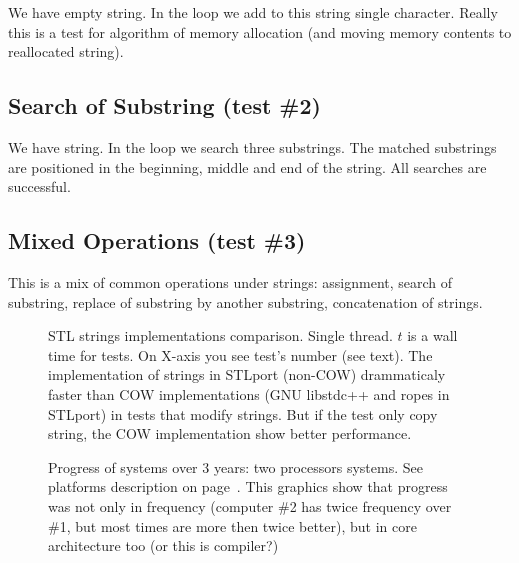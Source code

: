 \documentclass[a4paper]{article}
\providecommand{\STLport}{{\fontfamily{cmss}\selectfont STLport}}
\providecommand{\libstd}{{\fontfamily{cmtt}\selectfont GNU \mbox{libstdc++}}}
\begin{document}
We have empty string. In the loop we add to this string single
character.
Really this is a test for algorithm
of memory allocation (and moving memory contents to reallocated string).



\subsection{Search of Substring\label{search-string} (test \#2)}

We have string. In the loop we search three substrings.
The matched substrings are positioned in
the beginning, middle and end of the string. All searches are
successful.



\subsection{Mixed Operations\label{mixed-string} (test \#3)}

This is a mix of common operations under strings: assignment,
search of substring, replace of substring by another substring,
concatenation of strings.



\begin{figure}
  \begin{center}
    
  \end{center}
  \caption{STL strings implementations comparison. Single thread. $t$ is a wall time
           for tests. On X-axis you see test's number (see text).
           The implementation of strings in \STLport{} (non-COW)
           drammaticaly faster than COW implementations (\libstd{} and
           ropes in \STLport{}) in tests that modify strings.
           But if the test only copy string, the COW implementation show better
           performance.
           \label{STLport-gpp-strings}}
\end{figure}

\begin{figure}
  \begin{center}
    
  \end{center}
  \caption{Progress of systems over 3 years: two processors systems. See platforms description
           on page~\pageref{AMD}. This graphics show that progress was not only in
           frequency (computer \#2 has twice frequency over \#1, but most times
           are more then twice better),
           but in core architecture too (or this is compiler?)\label{amd-amd64}}
\end{figure}
\end{document}
